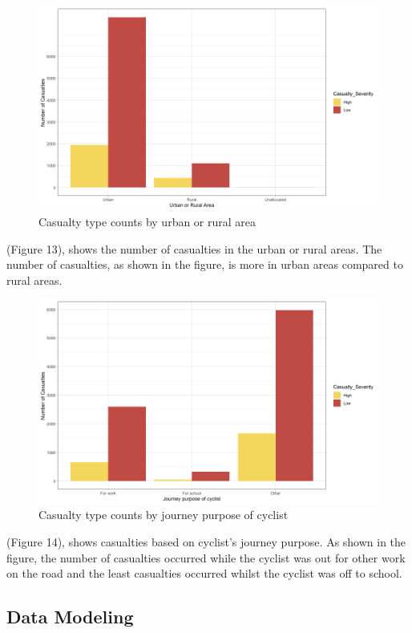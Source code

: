 \documentclass[
  a4paper,
]{article}
\begin{document}
\newpage
\begin{figure}[h!]

{\centering \includegraphics[width=0.75\linewidth]{ur} 

}

\caption{Casualty type counts by urban or rural area}\label{fig:unnamed-chunk-14}
\end{figure}

(Figure 13), shows the number of casualties in the urban or rural areas.
The number of casualties, as shown in the figure, is more in urban areas
compared to rural areas.

\begin{figure}[h!]

{\centering \includegraphics[width=0.75\linewidth]{jpc} 

}

\caption{Casualty type counts by journey purpose of cyclist}\label{fig:unnamed-chunk-15}
\end{figure}

(Figure 14), shows casualties based on cyclist's journey purpose. As
shown in the figure, the number of casualties occurred while the cyclist
was out for other work on the road and the least casualties occurred
whilst the cyclist was off to school.

\hypertarget{data-modeling}{%
\subsection{Data Modeling}\label{data-modeling}}
\end{document}
